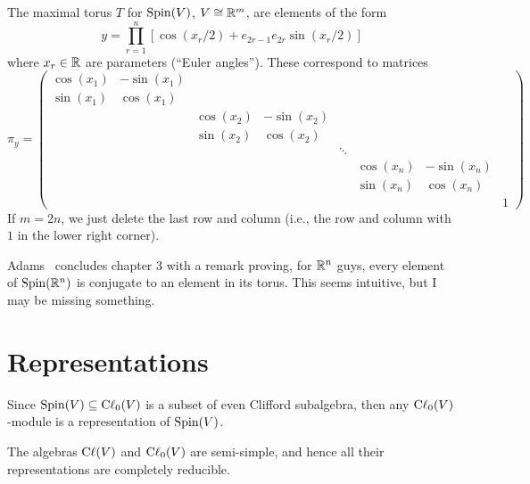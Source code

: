 The maximal torus $T$ for $\operatorname{Spin}(V)$, $V\cong\mathbb{R}^{m}$, are elements of
the form
\begin{equation}
y = \prod^{n}_{r=1}[\cos(x_{r}/2) + e_{2r-1}e_{2r}\sin(x_{r}/2)]
\end{equation}
where $x_{r}\in\mathbb{R}$ are parameters (``Euler angles''). These correspond
to matrices
\begin{equation}
  \pi_{y} = 
\begin{pmatrix}
\cos(x_{1}) & -\sin(x_{1}) &            &              & & & & \\
\sin(x_{1}) &  \cos(x_{1}) &            &              & & & & \\
           &              & \cos(x_{2}) & -\sin(x_{2}) & & & & \\
           &              & \sin(x_{2}) &  \cos(x_{2}) & & & & \\
 & & & & \ddots &            &              & \\
 & & & &        & \cos(x_{n}) & -\sin(x_{n}) & \\
 & & & &        & \sin(x_{n}) &  \cos(x_{n}) &  \\
 & & & &        &             &             & 1
\end{pmatrix}
\end{equation}
If $m=2n$, we just delete the last row and column (i.e., the row and
column with $1$ in the lower right corner).

\begin{remark}
Adams~\cite{adams1996:ex} concludes chapter 3 with a remark proving, for
$\mathbb{R}^{n}$ guys, every element of $\operatorname{Spin}(\mathbb{R}^{n})$ is conjugate to an
element in its torus. This seems intuitive, but I may be missing
something. 
\end{remark}

\section{Representations}

\M
Since $\operatorname{Spin}(V)\subseteq\mathrm{C}\ell_{0}(V)$ is a subset of even Clifford
subalgebra, then any $\mathrm{C}\ell_{0}(V)$-module is a representation of
$\operatorname{Spin}(V)$.

\begin{proposition}
The algebras $\mathrm{C}\ell(V)$ and $\mathrm{C}\ell_{0}(V)$ are semi-simple, and hence all
their representations are completely reducible.
\end{proposition}

